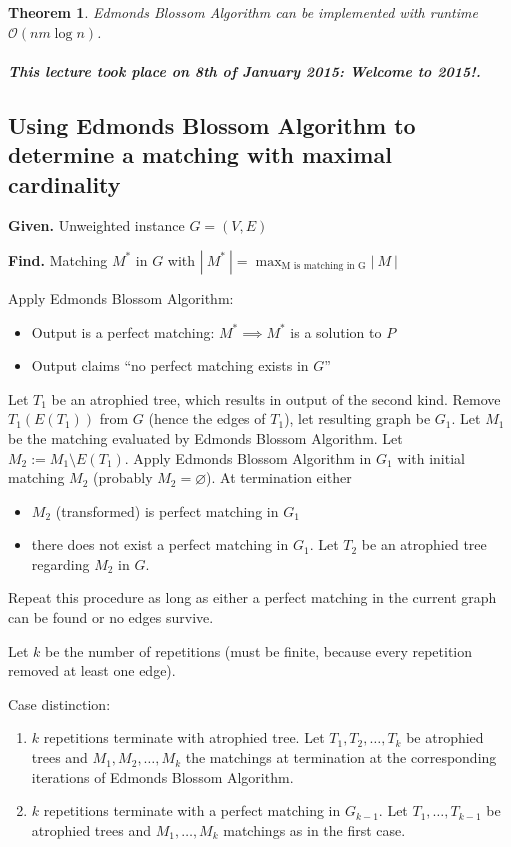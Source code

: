 \documentclass{article}
\newtheorem{theorem}{Theorem}
\newcommand{\card}[1]{\left|\:\!#1\:\!\right|}
\newcommand{\given}[1]{\textbf{Given.} #1\par}
\newcommand{\find}[1]{\textbf{Find.} #1\par}
\newcommand{\dateref}[1]{\paragraph{\textit{This lecture took place on #1.}}}
\begin{document}
\begin{theorem}\label{satz-6.11}
  Edmonds Blossom Algorithm can be implemented with runtime $\mathcal{O}(nm\log{n})$.
\end{theorem}

\dateref{8th of January 2015: Welcome to 2015!}

\subsection{Using Edmonds Blossom Algorithm to determine a matching with maximal cardinality}

\given{Unweighted instance $G = (V, E)$}
\find{Matching $M^*$ in $G$ with $\card{M^*} = \max_{\text{M is matching in G}}{\card{M}}$}

Apply Edmonds Blossom Algorithm:
\begin{itemize}
  \item Output is a perfect matching: $M^* \implies M^*$ is a solution to $P$
  \item Output claims ``no perfect matching exists in $G$''
\end{itemize}

Let $T_1$ be an atrophied tree, which results in output of the second kind.
Remove $T_1(E(T_1))$ from $G$ (hence the edges of $T_1$), let resulting graph be $G_1$.
Let $M_1$ be the matching evaluated by Edmonds Blossom Algorithm.
Let $M_2 := M_1 \setminus E(T_1)$.
Apply Edmonds Blossom Algorithm in $G_1$ with initial matching $M_2$ (probably $M_2 = \diameter$).
At termination either
\begin{itemize}
  \item $M_2$ (transformed) is perfect matching in $G_1$
  \item there does not exist a perfect matching in $G_1$.
    Let $T_2$ be an atrophied tree regarding $M_2$ in $G$.
\end{itemize}

Repeat this procedure as long as either a perfect matching in the current graph can be found or no edges survive.

Let $k$ be the number of repetitions (must be finite, because every repetition removed at least one edge).

Case distinction:
\begin{enumerate}
  \item $k$ repetitions terminate with atrophied tree.
    Let $T_1, T_2, \ldots, T_k$ be atrophied trees and $M_1, M_2, \ldots, M_k$ the matchings at termination at the corresponding iterations of Edmonds Blossom Algorithm.
  \item $k$ repetitions terminate with a perfect matching in $G_{k-1}$.
    Let $T_1, \ldots, T_{k-1}$ be atrophied trees and $M_1, \ldots, M_k$ matchings as in the first case.
\end{enumerate}
\end{document}
